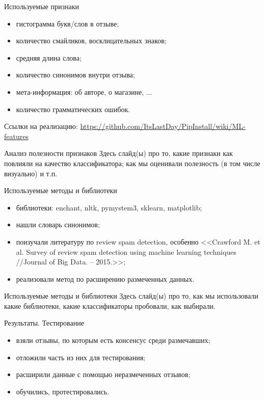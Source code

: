 \documentclass[mathserif,utf8,14pt]{beamer}
\begin{document}
\begin{frame}{Используемые признаки}
     \addtocounter{framenumber}{-1}
    \begin{itemize}
        \item гистограмма букв/слов в отзыве;
        \item количество смайликов, восклицательных знаков;
        \item средняя длина слова;
        \item количество синонимов внутри отзыва;
        \item мета-информация: об авторе, о магазине, $\ldots$
        \item количество грамматических ошибок.
    \end{itemize}
    Ссылки на реализацию: \url{https://github.com/ItsLastDay/PipInstall/wiki/ML-features}
\end{frame}

\begin{frame}{Анализ полезности признаков}
    Здесь слайд(ы) про то, какие признаки как повлияли на качество классификатора;
    как мы оценивали полезность (в том числе визуально) и т.п.
\end{frame}

\begin{frame}{Используемые методы и библиотеки}
    \begin{itemize}
        \item библиотеки: enchant, nltk, pymystem3, sklearn, matplotlib;
        \item нашли словарь синонимов;
        \item поизучали литературу по review spam detection, особенно
            <<Crawford M. et al. Survey of review spam detection using machine learning techniques //Journal of Big Data. – 2015.>>;
        \item реализовали метод по расширению размеченных данных.
    \end{itemize}
\end{frame}

\begin{frame}{Используемые методы и библиотеки}
    Здесь слайд(ы) про то, как мы использовали какие библиотеки,
    какие классификаторы пробовали, как выбирали.
\end{frame}

\begin{frame}{Результаты. Тестирование}
    \begin{itemize}
        \item взяли отзывы, по которым есть консенсус среди размечавших;
        \item отложили часть из них для тестирования;
        \item расширили данные с помощью неразмеченных отзывов;
        \item обучились, протестировались.
    \end{itemize}
\end{frame}
\end{document}
